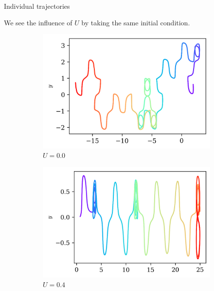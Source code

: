 \documentclass[10pt]{beamer}
\begin{document}
\begin{frame}{Individual trajectories}

We see the influence of $U$ by taking the same initial condition.

\begin{figure}[h]
\centering
\begin{subfigure}[b]{0.3\textwidth}
    \includegraphics[width=\textwidth]{graf_2ondas/2w_0.0.png}
    \caption{$U = 0.0$}
\end{subfigure}
\begin{subfigure}[b]{0.3\textwidth}
    \includegraphics[width=\textwidth]{graf_2ondas/2w_0.4.png}
    \caption{$U = 0.4$}
\end{subfigure}
\begin{subfigure}[b]{0.3\textwidth}

\end{subfigure}
\end{figure}
\end{frame}
\end{document}
